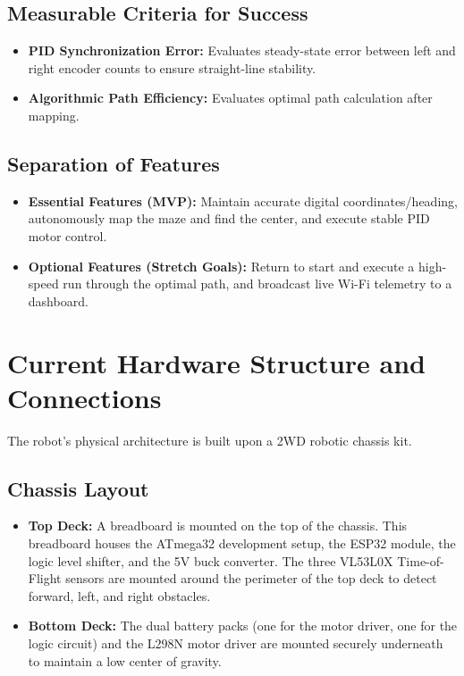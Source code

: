 \documentclass[12pt,a4paper]{article}
\begin{document}
\subsection{Measurable Criteria for Success}
\begin{itemize}
    \item \textbf{PID Synchronization Error:} Evaluates steady-state error between left and right encoder counts to ensure straight-line stability.
    \item \textbf{Algorithmic Path Efficiency:} Evaluates optimal path calculation after mapping.
\end{itemize}

\subsection{Separation of Features}
\begin{itemize}
    \item \textbf{Essential Features (MVP):} Maintain accurate digital coordinates/heading, autonomously map the maze and find the center, and execute stable PID motor control.
    \item \textbf{Optional Features (Stretch Goals):} Return to start and execute a high-speed run through the optimal path, and broadcast live Wi-Fi telemetry to a dashboard.
\end{itemize}

\section{Current Hardware Structure and Connections}
The robot's physical architecture is built upon a 2WD robotic chassis kit. 

\subsection{Chassis Layout}
\begin{itemize}
    \item \textbf{Top Deck:} A breadboard is mounted on the top of the chassis. This breadboard houses the ATmega32 development setup, the ESP32 module, the logic level shifter, and the 5V buck converter. The three VL53L0X Time-of-Flight sensors are mounted around the perimeter of the top deck to detect forward, left, and right obstacles.
    \item \textbf{Bottom Deck:} The dual battery packs (one for the motor driver, one for the logic circuit) and the L298N motor driver are mounted securely underneath to maintain a low center of gravity.
\end{itemize}
\end{document}
